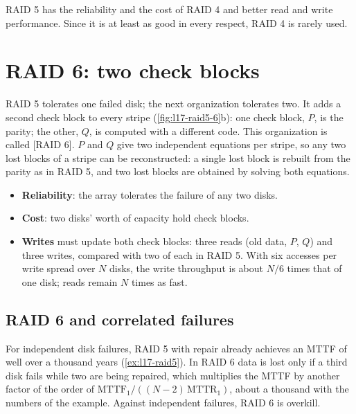 \documentclass[../main.tex]{subfiles}
\begin{document}
\begin{keypoint}
  RAID 5 has the reliability and the cost of RAID 4 and better read and write
  performance.  Since it is at least as good in every respect, RAID 4 is
  rarely used.
\end{keypoint}

\section{RAID 6: two check blocks}
\label{sec:l17-raid6}

RAID 5 tolerates one failed disk; the next organization tolerates
two.  It adds a second check
block to every stripe (\cref{fig:l17-raid5-6}b): one check block, $P$, is the
parity; the other, $Q$, is computed with a different code.  This
organization is called [RAID 6].  $P$ and $Q$ give two
independent equations per stripe, so any two lost blocks of a stripe can be
reconstructed: a single lost block is rebuilt from the parity as in RAID 5,
and two lost blocks are obtained by solving both equations.

\begin{itemize}
  \item \textbf{Reliability}: the array tolerates the failure of any two
    disks.
  \item \textbf{Cost}: two disks' worth of capacity hold check blocks.
  \item \textbf{Writes} must update both check blocks: three reads (old
    data, $P$, $Q$) and three writes, compared with two of each in RAID 5.
    With six accesses per write spread over $N$ disks, the write throughput
    is about $N/6$ times that of one disk; reads remain $N$ times as
    fast.
\end{itemize}

\subsection{RAID 6 and correlated failures}

For independent disk failures, RAID 5 with repair already achieves an MTTF
of well over a thousand years (\cref{ex:l17-raid5}).  In RAID 6 data is lost
only if a third disk fails while two are being repaired, which multiplies the
MTTF by another factor of the order of
$\mathrm{MTTF}_1/((N-2)\,\mathrm{MTTR}_1)$, about a thousand with the numbers
of the example.  Against independent
failures, RAID 6 is overkill.
\end{document}
